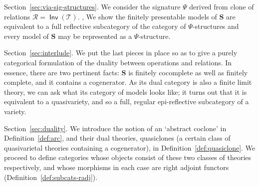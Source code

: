 \documentclass[11pt, a4paper, twoside,leqno]{amsart}
\newcommand{\cat}[1]{\mathbf{#1}}
\numberwithin{equation}{section}
\theoremstyle{plain}
\theoremstyle{definition}
\DeclareMathOperator{\Pol}{\mathsf{Pol}}
\DeclareMathOperator{\Inv}{\mathsf{Inv}}
\begin{document}
  Section~\ref{sec:via-sig-structures}.
  We consider
  the signature \(\Psi\) derived from clone of relations \(\mathscr{R}= \Inv(\mathscr{T}
  )\).
  ,
  We show the finitely presentable
  models of
  \(\cat{S}\) are equivalent to a full reflective subcategory of the category of
  \(\Psi\)-structures and every model of \(\cat{S}\) may be
  represented as a \(\Psi\)-structure.
  
  Section~\ref{sec:interlude}.
  We put the last pieces in place so as to give a purely categorical formulation of the duality
between operations and relations. In essence, there are two pertinent
facts: \(\cat{S}\) is finitely cocomplete as well as
finitely complete, and it contains a cogenerator. As its dual category is also a finite limit
theory, we can ask what its category of models looks like; it turns
out that it is equivalent to a quasivariety, and so a full, regular epi-reflective
subcategory of a variety.

  
Section~\ref{sec:duality}.
We introduce the notion of an `abstract coclone' in
  Definition~\ref{def:arc}, and their dual theories, quasiclones (a certain class of
quasivarietal theories containing a cogenerator), in
  Definition~\ref{def:quasiclone}. We proceed to define categories whose objects
  consist of these two classes of theories respectively, and whose morphisms in each case are
  right adjoint functors (Definition~\ref{def:subcats-radj}).
\end{document}

